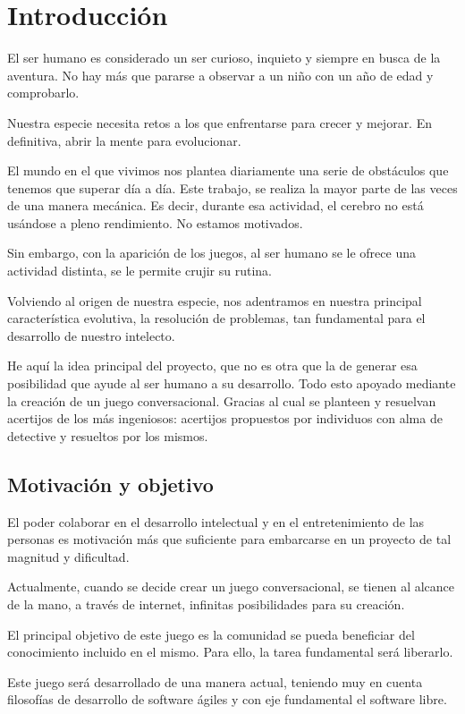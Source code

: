 \chapter{Introducción}
El ser humano es considerado un ser curioso, inquieto y siempre en busca de la aventura. No hay más que pararse a observar a un niño con un año de edad y comprobarlo.

Nuestra especie necesita retos a los que enfrentarse para crecer y mejorar. En definitiva, abrir la mente para evolucionar.

El mundo en el que vivimos nos plantea diariamente una serie de obstáculos que tenemos que superar día a día. Este trabajo, se realiza la mayor parte de las veces de una manera mecánica. Es decir, durante esa actividad, el cerebro no está usándose a pleno rendimiento. No estamos motivados.

Sin embargo, con la aparición de los juegos, al ser humano se le ofrece una actividad distinta, se le permite crujir su rutina.

Volviendo al origen de nuestra especie, nos adentramos en nuestra principal característica evolutiva, la resolución de problemas, tan fundamental para el desarrollo de nuestro intelecto.

He aquí la idea principal del proyecto, que no es otra que la de generar esa posibilidad que ayude al ser humano a su desarrollo. Todo esto apoyado mediante la creación de un juego conversacional. Gracias al cual se planteen y resuelvan acertijos de los más ingeniosos: acertijos propuestos por individuos con alma de detective y resueltos por los mismos.

\section{Motivación y objetivo}

El poder colaborar en el desarrollo intelectual y en el entretenimiento de las personas es motivación más que suficiente para embarcarse en un proyecto de tal magnitud y dificultad.

Actualmente, cuando se decide crear un juego conversacional, se tienen al alcance de la mano, a través de internet, infinitas posibilidades para su creación.

El principal objetivo de este juego es la comunidad se pueda beneficiar del conocimiento incluido en el mismo. Para ello, la tarea fundamental será liberarlo.

Este juego será desarrollado de una manera actual, teniendo muy en cuenta filosofías de desarrollo de software ágiles y con eje fundamental el software libre. 

